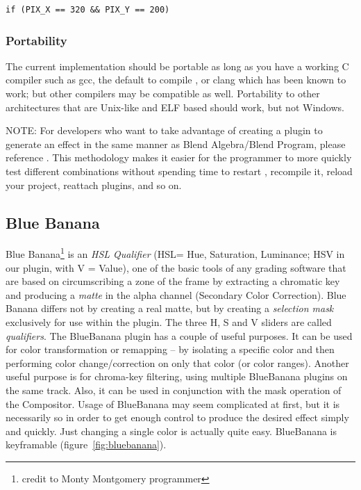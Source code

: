 \begin{lstlisting}[style=sh]
	if (PIX_X == 320 && PIX_Y == 200)
\end{lstlisting}


\subsubsection*{Portability}
\label{ssub:portability}

The current implementation should be portable as long as you have a working C compiler such as gcc, the default to compile \CGG{}, or clang which has been known to work; but other compilers may be compatible as well.  Portability to other architectures that are Unix-like and ELF based should work, but not Windows.

NOTE: For developers who want to take advantage of creating a plugin to generate an effect in the same manner as Blend Algebra/Blend Program, please reference . This methodology makes it easier for the programmer to more quickly test different combinations without spending time to restart \CGG{}, recompile it, reload your project, reattach plugins, and so on.


\subsection{Blue Banana}%
\label{sub:blue_banana}

Blue Banana\protect\footnote{credit to Monty Montgomery programmer} is an \textit{HSL Qualifier}  (HSL= Hue, Saturation, Luminance; HSV in our plugin, with V = Value), one of the basic tools of any grading software that are based on circumscribing a zone of the frame by extracting a chromatic key and producing a \textit{matte} in the alpha channel (Secondary Color Correction). Blue Banana differs not by creating a real matte, but by creating a \textit{selection mask} exclusively for use within the plugin. The three H, S and V sliders are called \textit{qualifiers}. The BlueBanana plugin has a couple of useful purposes. It can be used for color transformation or remapping -- by isolating a specific color and then performing color change/correction on only that color (or color ranges). Another useful purpose is for chroma-key filtering, using multiple BlueBanana plugins on the same track. Also, it can be used in conjunction with the mask operation of the Compositor. Usage of BlueBanana may seem complicated at first, but it is necessarily so in order to get enough control to produce the desired effect simply and quickly. Just changing a single color is actually quite easy. BlueBanana is keyframable (figure~\ref{fig:bluebanana}).

